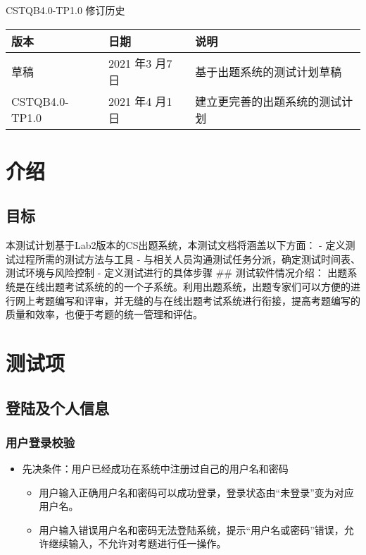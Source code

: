 \documentclass[hyperref, a4paper]{ctexart}
\providecommand{\tightlist}{%
  \setlength{\itemsep}{0pt}\setlength{\parskip}{0pt}}
\begin{document}
CSTQB4.0-TP1.0 修订历史

\begin{tabular}{|p{2cm}|p{3.3cm}|p{5cm}|}
\hline
版本 & 日期 & 说明\\
\hline
草稿 & 2021 年3 月7 日 & 基于出题系统的测试计划草稿\\
\hline
CSTQB4.0-TP1.0 & 2021 年4 月1 日 & 建立更完善的出题系统的测试计划\\
\hline
\end{tabular}

\hypertarget{ux4ecbux7ecd}{%
\section{介绍}\label{ux4ecbux7ecd}}

\hypertarget{ux76eeux6807}{%
\subsection{目标}\label{ux76eeux6807}}

本测试计划基于Lab2版本的CS出题系统，本测试文档将涵盖以下方面： -
定义测试过程所需的测试方法与工具 -
与相关人员沟通测试任务分派，确定测试时间表、测试环境与风险控制 -
定义测试进行的具体步骤 \#\# 测试软件情况介绍：
出题系统是在线出题考试系统的的一个子系统。利用出题系统，出题专家们可以方便的进行网上考题编写和评审，并无缝的与在线出题考试系统进行衔接，提高考题编写的质量和效率，也便于考题的统一管理和评估。

\hypertarget{ux6d4bux8bd5ux9879}{%
\section{测试项}\label{ux6d4bux8bd5ux9879}}

\hypertarget{ux767bux9646ux53caux4e2aux4ebaux4fe1ux606f}{%
\subsection{登陆及个人信息}\label{ux767bux9646ux53caux4e2aux4ebaux4fe1ux606f}}

\hypertarget{ux7528ux6237ux767bux5f55ux6821ux9a8c}{%
\subsubsection{用户登录校验}\label{ux7528ux6237ux767bux5f55ux6821ux9a8c}}

\begin{itemize}
\tightlist
\item
  先决条件：用户已经成功在系统中注册过自己的用户名和密码

  \begin{itemize}
  \tightlist
  \item
    用户输入正确用户名和密码可以成功登录，登录状态由``未登录''变为对应用户名。
  \item
    用户输入错误用户名和密码无法登陆系统，提示``用户名或密码''错误，允许继续输入，不允许对考题进行任一操作。
  \end{itemize}
\end{itemize}
\end{document}
